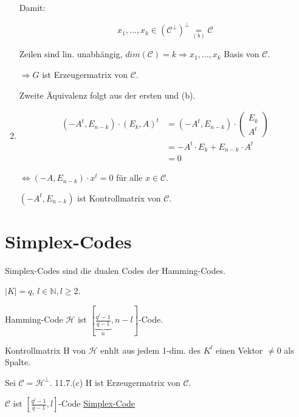 \documentclass[a4paper, openany]{book}
\begin{document}
\begin{enumerate}[label=(\alph*)]
	Damit:

	\[ x_1, ..., x_k \in (\mathcal{C}^{\perp})^{\perp} \underset{(b)}{=} \mathcal{C} \]

	Zeilen sind lin. unabhängig, $dim(\mathcal{C}) = k \Rightarrow x_1, ..., x_k$ Basis von $\mathcal{C}$.

	$\Rightarrow G$ ist Erzeugermatrix von $\mathcal{C}$.

	Zweite Äquivalenz folgt aus der ersten und (b).

	\item \begin{align*}
			(-A^t, E_{n-k}) \cdot (E_k, A)^t & = (-A^t, E_{n-k}) \cdot \begin{pmatrix}E_k \\ A^t \end{pmatrix} \\
			& = - A^t \cdot E_k + E_{n-k} \cdot A^t \\
			& = 0
		\end{align*}

	$\Leftrightarrow (-A, E_{n-k}) \cdot x^t = 0$ für alle $x \in \mathcal{C}$.

	\par \medskip

	$(-A^t, E_{n-k})$ ist Kontrollmatrix von $\mathcal{C}$.
\end{enumerate}

\section{Simplex-Codes}

Simplex-Codes sind die dualen Codes der Hamming-Codes. 

$|K| = q$, $l \in \mathbb{N}, l \ge 2$.

\par \medskip

Hamming-Code $\mathcal{H}$ ist $[\underbrace{\frac{q^l -1}{q-1}}_{n}, n-l]$-Code.

\par \medskip

Kontrollmatrix H von $\mathcal{H}$ enhlt aus jedem 1-dim. des $K^l$ einen Vektor $\neq 0$ als Spalte.

Sei $\mathcal{C} = \mathcal{H}^{\perp}$. 11.7.(c) H ist Erzeugermatrix von $\mathcal{C}$.

\par \medskip

$\mathcal{C}$ ist $[\frac{q^l-1}{q-1}, l]$-Code \underline{Simplex-Code}
\end{document}

